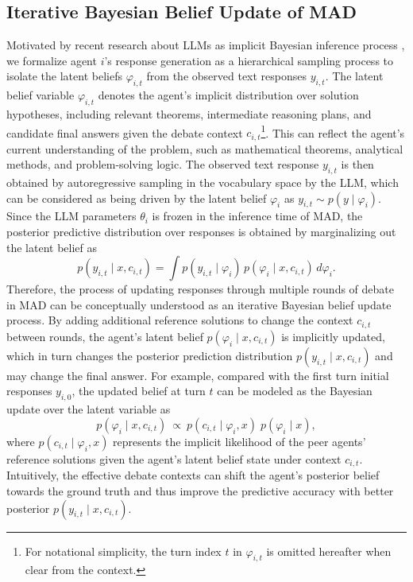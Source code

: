 \documentclass{article}
\theoremstyle{plain}
\theoremstyle{definition}
\theoremstyle{remark}
\begin{document}
\subsection{Iterative Bayesian Belief Update of MAD}\label{subsec: iterative_bayes} 
Motivated by recent research about LLMs as implicit Bayesian inference process \cite{jayasekera2025variational, xie2021explanation, choi2025debate}, we formalize agent $i$'s response generation as a hierarchical sampling process to  isolate the latent beliefs $\varphi_{i,t}$ from the observed text responses $y_{i,t}$. The latent belief variable $\varphi_{i,t}$ denotes the agent's implicit distribution over solution hypotheses, including relevant theorems, intermediate reasoning plans, and candidate final answers given the debate context $c_{i,t}$\footnote{For notational simplicity, the turn index $t$ in $\varphi_{i,t}$ is omitted hereafter when clear from the context.}. This can reflect the agent's current understanding of the problem, such as mathematical theorems, analytical methods, and problem-solving logic.
The observed text response $y_{i,t}$ is then obtained by autoregressive sampling in the vocabulary space by the LLM, which can be considered as being driven by the latent belief $\varphi_{i}$  as  $y_{i,t} \sim p(y \mid \varphi_{i})$. Since the LLM parameters $\theta_i$ is frozen in the inference time of MAD, the posterior predictive distribution over responses is obtained by marginalizing out the latent belief as
\begin{equation*}
 p(y_{i,t} \mid x,c_{i,t}) = \int p(y_{i,t} \mid \varphi_{i})\,p(\varphi_{i} \mid x,c_{i,t})\,d\varphi_{i}.
\end{equation*}
Therefore, the process of updating responses through multiple rounds of debate in MAD can be conceptually understood as an iterative Bayesian belief update process. By adding additional reference solutions to change the context $c_{i,t}$ between rounds, the agent's latent belief $p(\varphi_{i}\mid x,c_{i,t})$ is implicitly updated, which in turn changes the posterior prediction distribution $p(y_{i,t}\mid x,c_{i,t})$ and may change the final answer. For example, compared with the first turn initial responses $y_{i,0}$, the updated belief at turn $t$ can be modeled as the Bayesian update over the latent variable as 
\begin{equation}\label{eq:bayes_belief}
 p(\varphi_{i} \mid x,c_{i,t})
\ \propto\
p(c_{i,t}\mid \varphi_{i},x)\;p(\varphi_{i} \mid x),
\end{equation}
where $p(c_{i,t}\mid \varphi_{i},x)$ represents the implicit likelihood of the peer agents' reference solutions given the agent's latent belief state under context $c_{i,t}$. Intuitively, the effective debate contexts can shift the agent's posterior belief towards the ground truth and thus improve the predictive accuracy with better posterior $p(y_{i,t}\mid x,c_{i,t})$.
\end{document}
